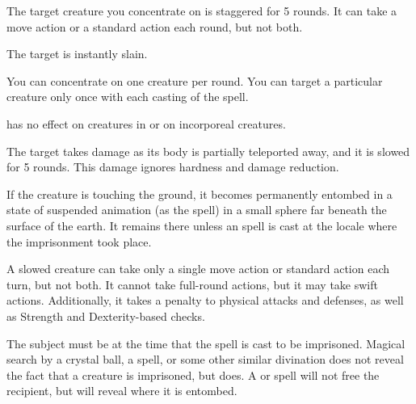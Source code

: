 \spellrng{\rngclose}
\begin{spellhealthy}
  The target creature you concentrate on is staggered for 5 rounds. It can take a move action or a standard action each round, but not both.
\end{spellhealthy}
\begin{spellblood}
  The target is instantly slain.
\end{spellblood}
\begin{spellnotes}
  You can concentrate on one creature per round. You can target a particular creature only once with each casting of the spell.
  \par {} has no effect on creatures in  or on incorporeal creatures.
\end{spellnotes}

\spellrng{\rngclose}
\begin{spelleffect}
  The target takes damage as its body is partially teleported away, and it is slowed for 5 rounds. This damage ignores hardness and damage reduction.
\end{spelleffect}
\begin{spellblood}
  If the creature is touching the ground, it becomes permanently entombed in a state of suspended animation (as the  spell) in a small sphere far beneath the surface of the earth. It remains there unless an  spell is cast at the locale where the imprisonment took place.
\end{spellblood}
\begin{spellnotes}
A slowed creature can take only a single move action or standard action each turn, but not both. It cannot take full-round actions, but it may take swift actions. Additionally, it takes a  penalty to physical attacks and defenses, as well as Strength and Dexterity-based checks.

  The subject must be \bloodied at the time that the spell is cast to be imprisoned. Magical search by a crystal ball, a  spell, or some other similar divination does not reveal the fact that a creature is imprisoned, but  does. A  or  spell will not free the recipient, but will reveal where it is entombed.
\end{spellnotes}

